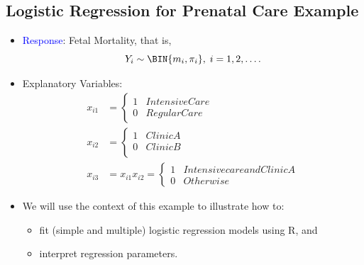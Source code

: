 \documentclass[oneside]{book}\usepackage[]{graphicx}\usepackage[svgnames]{xcolor}
\begin{document}
\subsection*{Logistic Regression for Prenatal Care Example}
\begin{itemize}
      \item \textcolor{Blue}{Response}: Fetal Mortality, that is,
            \[ Y_i \sim \BIN{m_i,\pi_i},\; i=1,2,\ldots. \]
      \item Explanatory Variables:
            \begin{align*}
                  x_{i1} & =\begin{cases*}
                                  1 & Intensive Care \\
                                  0 & Regular Care
                            \end{cases*}                           \\
                  x_{i2} & =\begin{cases*}
                                  1 & Clinic A \\
                                  0 & Clinic B \\
                            \end{cases*}                                \\
                  x_{i3} & =x_{i1}x_{i2}=\begin{cases*}
                                               1 & Intensive care and Clinic A \\
                                               0 & Otherwise
                                         \end{cases*}
            \end{align*}
      \item We will use the context of this example to illustrate how to:
            \begin{itemize}
                  \item fit (simple and multiple) logistic regression models using R, and
                  \item interpret regression parameters.
            \end{itemize}
\end{itemize}
\end{document}
